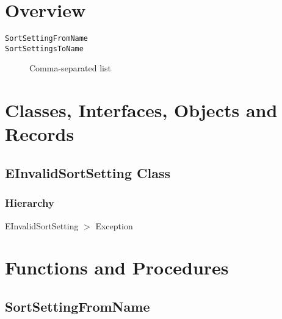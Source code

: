 \documentclass{report}
\newif\ifpdf
\begin{document}
\section{Overview}
\begin{description}
\item[\texttt{\begin{ttfamily}EInvalidSortSetting\end{ttfamily} Class}]
\end{description}
\begin{description}
\item[\texttt{SortSettingFromName}]
\item[\texttt{SortSettingsToName}]Comma{-}separated list
\end{description}
\section{Classes, Interfaces, Objects and Records}
\ifpdf
\subsection*{\large{\textbf{EInvalidSortSetting Class}}\normalsize\hspace{1ex}\hrulefill}
\else
\subsection*{EInvalidSortSetting Class}
\fi
\label{PasDoc_SortSettings.EInvalidSortSetting}
\subsubsection*{\large{\textbf{Hierarchy}}\normalsize\hspace{1ex}\hfill}
EInvalidSortSetting {$>$} Exception
\section{Functions and Procedures}
\ifpdf
\subsection*{\large{\textbf{SortSettingFromName}}\normalsize\hspace{1ex}\hrulefill}
\else
\end{document}

